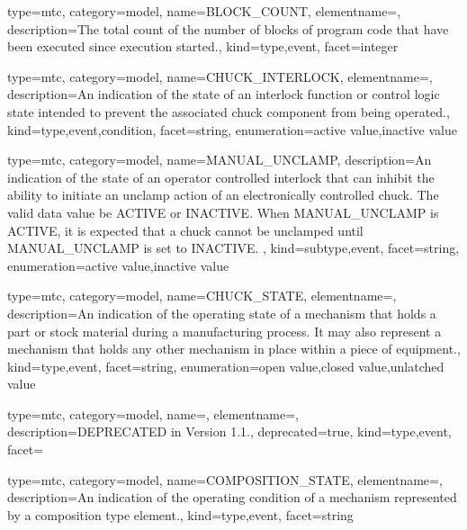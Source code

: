 {
  type=mtc,
  category=model,
  name={BLOCK\_COUNT},
  elementname=,
  description={The total count of the number of blocks of program code that have been executed since execution started.},
  kind={type,event},
  facet={\gls{integer}}
}


{
  type=mtc,
  category=model,
  name={CHUCK\_INTERLOCK},
  elementname=,
  description={An indication of the state of an interlock function or control logic state intended to prevent the associated \gls{chuck} component from being operated.},
  kind={type,event,condition},
  facet={\gls{string}},
  enumeration={\gls{active value},\gls{inactive value}}
}


{
  type=mtc,
  category=model,
  name={MANUAL\_UNCLAMP},
  description={An indication of the state of an operator controlled interlock that can inhibit the ability to initiate an unclamp action of an electronically controlled chuck.  The \gls{valid data value} \must be ACTIVE or INACTIVE. \newline When MANUAL\_UNCLAMP is ACTIVE, it is expected that a chuck cannot be unclamped until MANUAL\_UNCLAMP is set to INACTIVE. },
  kind={subtype,event},
  facet={\gls{string}},
  enumeration={\gls{active value},\gls{inactive value}}
}


{
  type=mtc,
  category=model,
  name={CHUCK\_STATE},
  elementname=,
  description={An indication of the operating state of a mechanism that holds a part or stock material during a manufacturing process. It may also represent a mechanism that holds any other mechanism in place within a piece of equipment.},
  kind={type,event},
  facet={\gls{string}},
  enumeration={\gls{open value},\gls{closed value},\gls{unlatched value}}
}


{
  type=mtc,
  category=model,
  name=,
  elementname=,
  description={DEPRECATED in Version 1.1.},
  deprecated={true},
  kind={type,event},
  facet={}
}


{
  type=mtc,
  category=model,
  name={COMPOSITION\_STATE},
  elementname=,
  description={An indication of the operating condition of a mechanism represented by a \gls{composition} type element.},
  kind={type,event},
  facet={\gls{string}}
}


